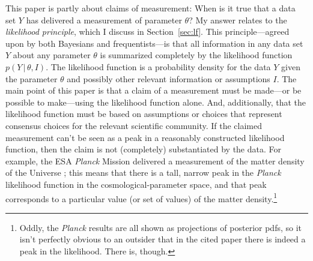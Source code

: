 \documentclass{article}
\newcommand{\sectionname}{Section}
\newcommand{\secref}[1]{\sectionname~\ref{#1}}
\newcommand{\given}{\,|\,}
\begin{document}
This paper is partly about claims of measurement:
When is it true that a data set $Y$ has delivered a measurement of parameter $\theta$?
My answer relates to the \emph{likelihood principle}, which I discuss in \secref{sec:lf}.
This principle---agreed upon by both Bayesians and frequentists---is that all information in any data set $Y$ about any parameter $\theta$ is summarized completely by the likelihood function $p(Y\given\theta, I)$.
The likelihood function is a probability density for the data $Y$ given the parameter $\theta$ and possibly other relevant information or assumptions $I$.
The main point of this paper is that a claim of a measurement must be made---or be possible to make---using the likelihood function alone.
And, additionally, that the likelihood function must be based on assumptions or choices that represent consensus choices for the relevant scientific community.
If the claimed measurement can't be seen as a peak in a reasonably constructed likelihood function, then the claim is not (completely) substantiated by the data.
For example, the ESA \textsl{Planck} Mission \cite{Planck} delivered a measurement of the matter density of the Universe \cite{planck18};
this means that there is a tall, narrow peak in the \textsl{Planck} likelihood function in the cosmological-parameter space, and that peak corresponds to a particular value (or set of values) of the matter density.\footnote{Oddly, the \textsl{Planck} results are all shown as projections of posterior pdfs, so it isn't perfectly obvious to an outsider that in the cited paper \cite{planck18} there is indeed a peak in the likelihood. There is, though.}
\end{document}
